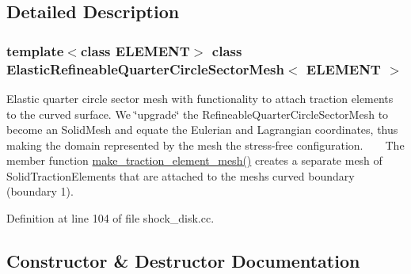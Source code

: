\subsection{Detailed Description}
\subsubsection*{template$<$class E\+L\+E\+M\+E\+NT$>$\newline
class Elastic\+Refineable\+Quarter\+Circle\+Sector\+Mesh$<$ E\+L\+E\+M\+E\+N\+T $>$}

Elastic quarter circle sector mesh with functionality to attach traction elements to the curved surface. We \char`\"{}upgrade\char`\"{} the Refineable\+Quarter\+Circle\+Sector\+Mesh to become an Solid\+Mesh and equate the Eulerian and Lagrangian coordinates, thus making the domain represented by the mesh the stress-\/free configuration. ~\newline
~\newline
The member function {\ttfamily \hyperlink{classElasticRefineableQuarterCircleSectorMesh_ad9734ea7aee2141079544bb782d3ace1}{make\+\_\+traction\+\_\+element\+\_\+mesh()}} creates a separate mesh of Solid\+Traction\+Elements that are attached to the mesh\textquotesingle{}s curved boundary (boundary 1). 

Definition at line 104 of file shock\+\_\+disk.\+cc.



\subsection{Constructor \& Destructor Documentation}
\mbox{\label{classElasticRefineableQuarterCircleSectorMesh_a123699deecd2a908a7a882a9d2a9f4dd}} 
